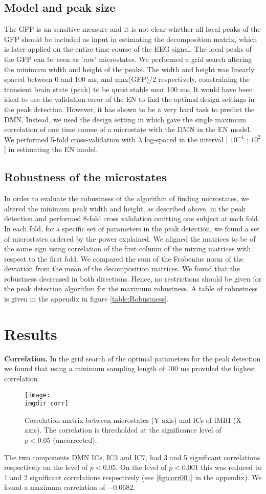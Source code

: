 \documentclass{article}
\newcommand{\imgdir}{Images/} %
\begin{document}
\subsection{Model and peak size}
The GFP is an sensitive measure and it is not clear whether all local peaks of the GFP should be included as input in estimating the decomposition matrix, which is later applied on the entire time course of the EEG signal. The local peaks of the GFP can be seen as 'raw' microstates. We performed a grid search altering the minimum width and height of the peaks. The width and height was linearly spaced between 0 and 100 ms, and max(GFP)/2 respectively, constraining the transient brain state (peak) to be quasi stable near 100 ms.
It would have been ideal to use the validation error of the EN to find the optimal design settings in the peak detection. However, it has shown to be a very hard task to predict the DMN, Instead, we used the design setting in which gave the single maximum correlation of one time course of a microstate with the DMN in the EN model.
We performed 5-fold cross-validation with $\lambda$ log-spaced in the interval 
[ $10^{-4}$ ; $10^2$] in estimating the EN model.
\subsection{Robustness of the microstates}
In order to evaluate the robustness of the algorithm of finding microstates, we altered the minimum peak width and height, as described above, in the peak detection and performed 8-fold cross validation omitting one subject at each fold. In each fold, for a specific set of parameters in the peak detection, we found a set of microstates ordered by the power explained. We aligned the matrices to be of the same sign using correlation of the first column of the mixing matrices with respect to the first fold. We compared the sum of the Frobenius norm of the deviation from the mean of the decomposition matrices. We found that the robustness decreased in both directions. Hence, no restrictions should be given for the peak detection algorithm for the maximum robustness. A table of robustness is given in the appendix in figure \ref{table:Robustness}.
\section{Results}

\textbf{Correlation.} In the grid search of the optimal parameters for the peak detection we found that using a minimum sampling length of 100 ms provided the highest correlation.
\begin{figure}[!ht]
    \centering
    \texttt{[image: \\imgdir corr]}
    \caption{Correlation matrix between microstates (Y axis) and ICs of fMRI (X axis). The correlation is thresholded at the significance level of $p<0.05$ (uncorrected).}
    \label{fig:grid}
\end{figure}
The two components DMN ICs, IC3 and IC7, had 3 and 5 significant correlations respectively on the level of $p<0.05$. On the level of $p<0.001$ this was reduced to 1 and 2 significant correlations respectively (see \ref{fig:corr001} in the appendix). We found a maximum correlation of $-0.0682$.
\end{document}
